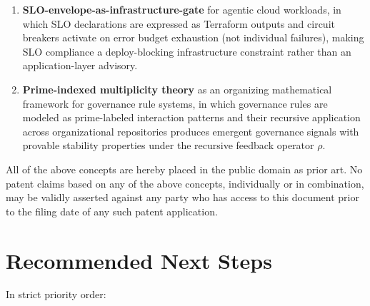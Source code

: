 \documentclass[12pt,a4paper]{article}
\theoremstyle{definition}
\theoremstyle{remark}
\begin{document}
\begin{enumerate}
  \item \textbf{SLO-envelope-as-infrastructure-gate} for agentic cloud workloads,
    in which SLO declarations are expressed as Terraform outputs and circuit
    breakers activate on error budget exhaustion (not individual failures),
    making SLO compliance a deploy-blocking infrastructure constraint rather
    than an application-layer advisory.

  \item \textbf{Prime-indexed multiplicity theory} as an organizing mathematical
    framework for governance rule systems, in which governance rules are
    modeled as prime-labeled interaction patterns and their recursive
    application across organizational repositories produces emergent
    governance signals with provable stability properties under the
    recursive feedback operator $\rho$.

\end{enumerate}

All of the above concepts are hereby placed in the public domain as prior art.
No patent claims based on any of the above concepts, individually or in
combination, may be validly asserted against any party who has access to this
document prior to the filing date of any such patent application.


\section{Recommended Next Steps}

In strict priority order:
\end{document}
